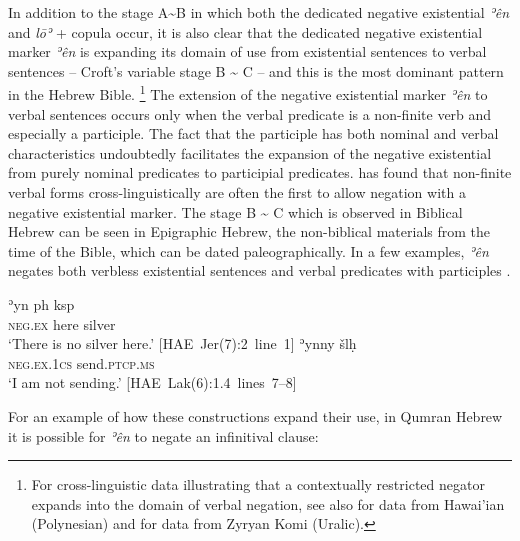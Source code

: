 ﻿\documentclass[output=paper]{langsci/langscibook}
\begin{document}
In addition to the stage A{\textasciitilde}B in which both the dedicated
negative existential \textit{ʾên} and \textit{lōʾ}  + copula occur, it is
also clear that the dedicated negative existential marker \textit{ʾên}  is
expanding its domain of use from existential sentences to verbal sentences
-- Croft's variable stage B {\textasciitilde} C -- and this is the most
dominant pattern in the Hebrew Bible.%
%
    \footnote{For cross-linguistic data illustrating that a contextually
    restricted negator expands into the domain of verbal negation, see also
    \textcite{Veselinova2014} for data from Hawai'ian (Polynesian) and
    \textcite{Veselinova2015} for data from Zyryan Komi (Uralic).}
%
The extension of the negative existential marker \textit{ʾên} to verbal
sentences occurs only when the verbal predicate is a non-finite verb and
especially a participle. The fact that the participle has both nominal and
verbal characteristics
\parencites{AndersenForbes2007}[33--35]{AndersenForbes2012}
undoubtedly facilitates the expansion of the negative existential from
purely nominal predicates to participial predicates.
\textcite[157]{Veselinova2016} has found that non-finite verbal forms
cross-linguistically are often the first to allow negation with a negative
existential marker. The stage B {\textasciitilde} C which is observed in
Biblical Hebrew can be seen in Epigraphic Hebrew, the non-biblical
materials from the time of the Bible, which can be dated paleographically.
In a few examples, \textit{ʾên} negates both verbless existential sentences
 and verbal predicates with participles
. 
%
\begin{exe}\ex \label{ex:heb-silver}
    \gll ʾyn   {\ob}p{\cb}h ksp\\
\textsc{neg.ex}  here    silver \\
    \glt `There is no silver here.' \mbox{[HAE Jer(7):2
    line 1]\footnotemark}
\ex \label{ex:heb-sending}
    \gll ʾyn{\ob}n{\cb}y šlḥ \\
\textsc{neg.ex.1cs}      send.\textsc{ptcp.ms} \\
    \glt `I am not sending.' \mbox{[HAE Lak(6):1.4
    lines 7--8]\footnotemark}
    \end{exe}
%
For an example of how these constructions expand their use, in Qumran Hebrew it is possible for \textit{ʾên} to negate an infinitival clause:
\end{document}
